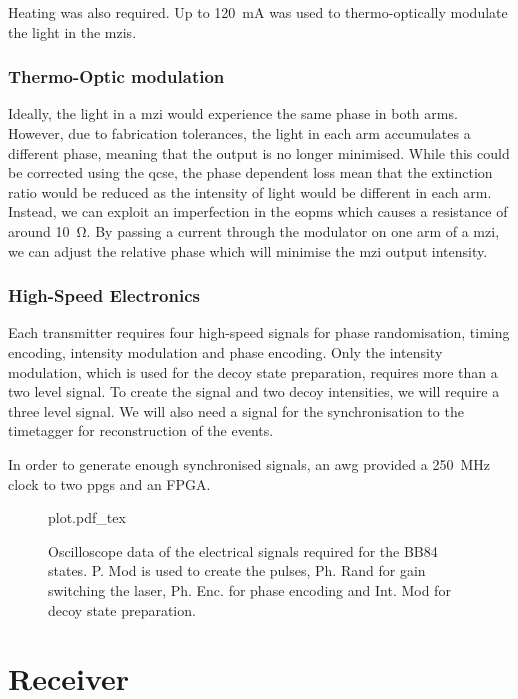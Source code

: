 Heating was also required. Up to \SI{120}{mA} was used to thermo-optically modulate the light in the \acp{mzi}.

\subsubsection*{Thermo-Optic modulation}

Ideally, the light in a \ac{mzi} would experience the same phase in both arms. However, due to fabrication tolerances, the light in each arm accumulates a different phase, meaning that the output is no longer minimised. While this could be corrected using the \ac{qcse}, the phase dependent loss mean that the extinction ratio would be reduced as the intensity of light would be different in each arm. Instead, we can exploit an imperfection in the \acp{eopm} which causes a resistance of around \SI{10}{\ohm}. By passing a current through the modulator on one arm of a \ac{mzi}, we can adjust the relative phase which will minimise the \ac{mzi} output intensity.

\subsubsection*{High-Speed Electronics}

Each transmitter requires four high-speed signals for phase randomisation, timing encoding, intensity modulation and phase encoding. Only the intensity modulation, which is used for the decoy state preparation, requires more than a two level signal. To create the signal and two decoy intensities, we will require a three level signal. We will also need a signal for the synchronisation to the timetagger for reconstruction of the events. 

In order to generate enough synchronised signals, an \ac{awg} provided a \SI{250}{\MHz} clock to two \acp{ppg} and an FPGA. 

\begin{figure}[tbp]
	\centering
	\def\svgwidth{\textwidth} 
	{plot.pdf_tex}
	\caption[Electrical signals for BB84 state generation]{Oscilloscope data of the electrical signals required for the BB84 states. P. Mod is used to create the pulses, Ph. Rand for gain switching the laser, Ph. Enc. for phase encoding and Int. Mod for decoy state preparation.}
	\label{fig:elec_signals}
\end{figure}

\section{Receiver}

